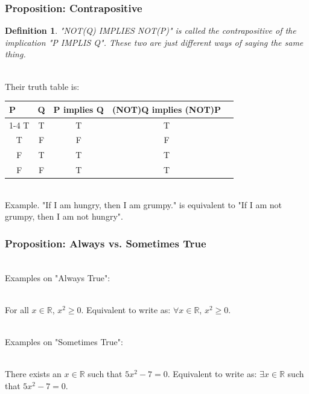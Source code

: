 \documentclass{beamer}
\newtheorem{defn}{Definition}
\numberwithin{equation}{section}
\begin{document}
\begin{frame}
\frametitle{Proposition: Contrapositive}

\begin{defn}
"NOT(Q) IMPLIES NOT(P)" is called the contrapositive of the implication "P IMPLIS Q". These two are just different ways of saying the same thing.
\end{defn} \pause

\ \\Their truth table is:

\begin{table}[]
\begin{tabular}{ccccl}
\multicolumn{1}{l}{P} & \multicolumn{1}{l}{Q} & \multicolumn{1}{l}{P implies Q} & (NOT)Q implies (NOT)P &  \\ \cline{1-4}
T                     & T                     & T                               & T                     &  \\
T                     & F                     & F                               & F                     &  \\
F                     & T                     & T                               & T                     &  \\
F                     & F                     & T                               & T                     & 
\end{tabular}
\end{table} \pause

\ \\Example. "If I am hungry, then I am grumpy." is equivalent to "If I am not grumpy, then I am not hungry". 

\end{frame}



\begin{frame}
\frametitle{Proposition: Always vs. Sometimes True}

\ \\Examples on "Always True": \pause

\ \\For all $x \in \mathbb{R}$, $x^{2} \geq 0$. Equivalent to write as: $\forall x \in \mathbb{R}$, $x^{2} \geq 0$. \pause

\ \\Examples on "Sometimes True": \pause

\ \\There exists an $x \in \mathbb{R}$ such that $5 x^{2} - 7 = 0$. Equivalent to write as: $\exists x \in \mathbb{R}$ such that $5 x^{2} - 7 = 0$.

\end{frame}
\end{document}
